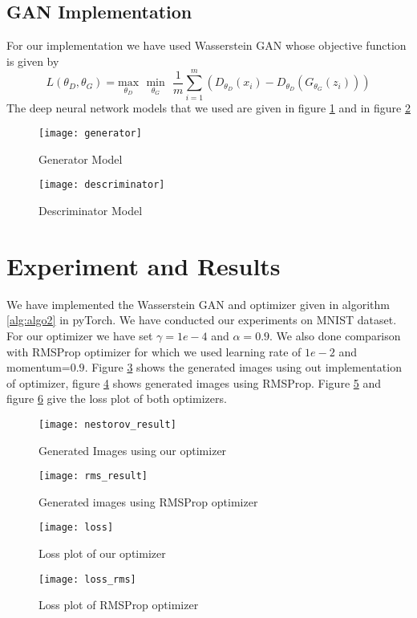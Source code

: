 \documentclass{article}
\begin{document}
\subsection{GAN Implementation}
For our implementation we have used Wasserstein GAN whose objective function is given by
\begin{equation}
L(\theta_D,\theta_G)=\underset{\theta_D}{\text{max}} \text{  }\underset{\theta_G}{\text{min}}\text{  }\frac{1}{m}\sum_{i=1}^{m}(D_{\theta_D}(x_i)-D_{\theta_D}(G_{\theta_G}(z_i)))
\end{equation}
The deep neural network models that we used are given in figure \ref{fig:generator} and in figure \ref{fig:descriminator}
\begin{figure}[h]
    \centering
    \texttt{[image: generator]}
    \caption{Generator Model}
    \label{fig:generator}
\end{figure}
\begin{figure}[h]
    \centering
    \texttt{[image: descriminator]}
    \caption{Descriminator Model}
    \label{fig:descriminator}
\end{figure}
\section{Experiment and Results}
We have implemented the Wasserstein GAN and optimizer given in algorithm \ref{alg:algo2} in pyTorch. We have conducted our experiments on MNIST dataset. For our optimizer we have set $\gamma=1e-4$ and $\alpha=0.9$. We also done comparison with RMSProp optimizer for which we used learning rate of $1e-2$ and momentum=$0.9$. Figure \ref{result_our} shows the generated images using out implementation of optimizer, figure \ref{rms_result} shows generated images using RMSProp. Figure \ref{loss} and figure \ref{rms_loss} give the loss plot of both optimizers.
\newpage
\begin{figure}[h]
    \centering
    \texttt{[image: nestorov\_result]}
    \caption{Generated Images using our optimizer}
    \label{result_our}
\end{figure}
\begin{figure}[h]
    \centering
    \texttt{[image: rms\_result]}
    \caption{Generated images using RMSProp optimizer}
    \label{rms_result}
\end{figure}
\begin{figure}[h]
    \centering
    \texttt{[image: loss]}
    \caption{Loss plot of our optimizer}
    \label{loss}
\end{figure}
\newpage
\begin{figure}[h]
    \centering
    \texttt{[image: loss\_rms]}
    \caption{Loss plot of RMSProp optimizer}
    \label{rms_loss}
\end{figure}
\end{document}
